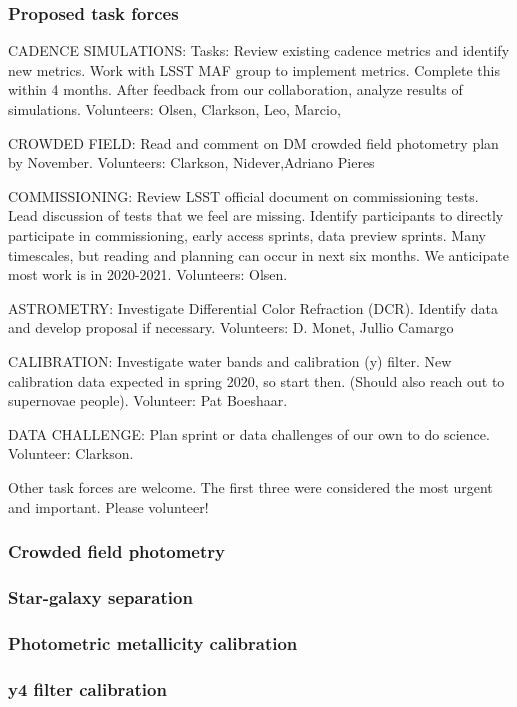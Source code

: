 \subsubsection{Proposed task forces}

CADENCE SIMULATIONS: Tasks: Review existing cadence metrics and identify new metrics. Work with LSST MAF group to implement metrics. Complete this within 4 months. After feedback from our collaboration, analyze results of simulations.  Volunteers: Olsen, Clarkson, Leo, Marcio,

CROWDED FIELD: Read and comment on DM crowded field photometry plan by November. Volunteers: Clarkson, Nidever,Adriano Pieres 

COMMISSIONING: Review LSST official document on commissioning tests. Lead discussion of tests that we feel are missing. Identify participants to directly participate in commissioning, early access sprints, data preview sprints. Many timescales, but reading and planning can occur in next six months. We anticipate most work is in 2020-2021. Volunteers: Olsen. 

ASTROMETRY: Investigate Differential Color Refraction (DCR). Identify data and develop proposal if necessary. Volunteers: D. Monet, Jullio Camargo

CALIBRATION: Investigate water bands and calibration (y) filter. New calibration data expected in spring 2020, so start then. (Should also reach out to supernovae people). Volunteer: Pat Boeshaar.

DATA CHALLENGE: Plan sprint or data challenges of our own to do science. Volunteer: Clarkson.

Other task forces are welcome. The first three were considered the most urgent and important.  Please volunteer! 


\subsubsection{Crowded field photometry}

\subsubsection{Star-galaxy separation}

\subsubsection{Photometric metallicity calibration}

\subsubsection{y4 filter calibration}

